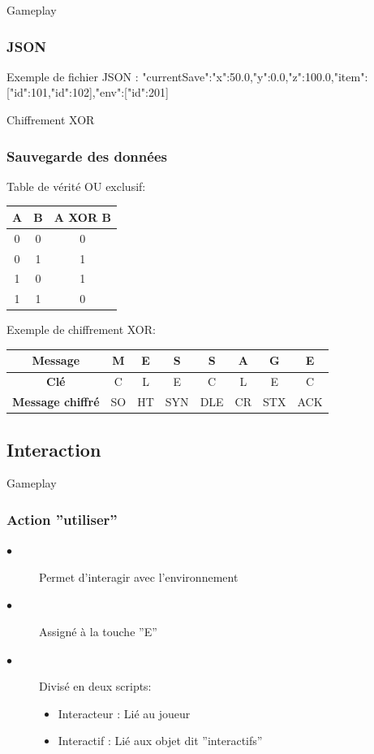 \begin{frame}{Gameplay}
\frametitle{JSON}
\setlength{\parindent}{5ex}
Exemple de fichier JSON :
\newline
\newline
{"currentSave":{"x":50.0,"y":0.0,"z":100.0},"item":[{"id":101},{"id":102}],"env":[{"id":201}]}
\end{frame}

\begin{frame}{Chiffrement XOR}
\frametitle{Sauvegarde des données}
\begin{minipage}{.3\textwidth}
  \centering
  Table de vérité OU exclusif:
  \newline
  \newline
    \begin{tabular}{|c||c||c|}
        \hline
        \textbf{A} & \textbf{B} & \textbf{A XOR B}\\
        \hline
             0 & 0 & 0 \\
        \hline
            0 & 1 & 1 \\
        \hline
            1 & 0 & 1 \\
        \hline
            1 & 1 & 0 \\
        \hline
    \end{tabular}
\end{minipage}%
\begin{minipage}{.7\textwidth}
  \centering
  Exemple de chiffrement XOR:
  \newline
  \newline
    \begin{tabular}{|c||c||c||c||c||c||c||c|}
        \hline
            \textbf{Message} & M & E & S & S & A & G & E\\
        \hline
            \textbf{Clé} & C & L & E & C & L & E & C \\
        \hline
           \textbf{Message chiffré} & SO & HT & SYN & DLE & CR & STX & ACK\\
        \hline
    \end{tabular}
  \label{fig:xor}
\end{minipage}

\end{frame}

\subsection{Interaction}
\begin{frame}{Gameplay}
\frametitle{Action ''utiliser''}
\begin{description}
  \item[$\bullet$] Permet d'interagir avec l'environnement
  \item[$\bullet$] Assigné à la touche ''E''
  \item[$\bullet$] Divisé en deux scripts:
  \begin{itemize}
      \item [] Interacteur : Lié au joueur
      \item [] Interactif : Lié aux objet dit ''interactifs''
  \end{itemize}
\end{description}
\end{frame}


